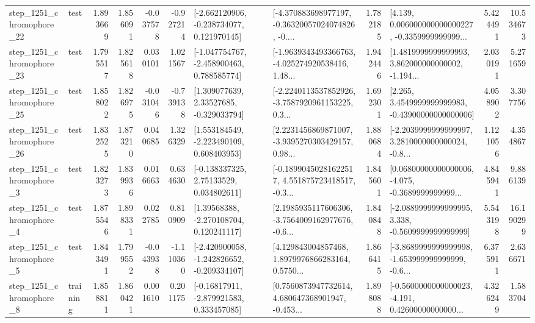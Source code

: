 \begin{tabular}{llrrrrllrlrr}
 step\_1251\_chromophore\_22 &      test &      1.893669 &    1.856091 &     -0.037578 & -0.927214 &   [-2.662120906, -0.238734077, 0.121970145] &  [-4.370883698977197, -0.36320057024074826, -0.... &       1.782185 &  [4.139, 0.006000000000000227, -0.3359999999999... &            5.424491 &         10.534673 \\
 step\_1251\_chromophore\_23 &      test &      1.795517 &    1.825618 &      0.030101 &  1.021567 &   [-1.047754767, -2.458900463, 0.788585774] &  [-1.9639343493366763, -4.025274920538416, 1.48... &       1.942446 &  [1.4819999999999993, 3.862000000000002, -1.194... &            2.030191 &          5.271659 \\
 step\_1251\_chromophore\_25 &      test &      1.858022 &    1.826975 &     -0.031046 & -0.739138 &     [1.309077639, 2.33527685, -0.329033794] &  [-2.2240113537852926, -3.7587920961153225, 0.3... &       1.692301 &  [2.265, 3.4549999999999983, -0.43900000000000006] &            4.058902 &          3.307756 \\
 step\_1251\_chromophore\_26 &      test &      1.832525 &    1.873210 &      0.040685 &  1.326329 &    [1.553184549, -2.223490109, 0.608403953] &  [2.2231456869871007, -3.9395270303429157, 0.98... &       1.880684 &  [-2.2039999999999997, 3.2810000000000024, -0.8... &            1.121056 &          4.354867 \\
  step\_1251\_chromophore\_3 &      test &      1.823273 &    1.839936 &      0.016663 &  0.634630 &     [-0.138337325, 2.75133529, 0.034802611] &  [-0.18990450281622517, 4.551875723418517, -0.3... &       1.845601 &  [0.06800000000000006, -4.075, -0.3689999999999... &            4.845941 &          9.886139 \\
  step\_1251\_chromophore\_4 &      test &      1.875546 &    1.898331 &      0.022785 &  0.810909 &     [1.39568388, -2.270108704, 0.120241117] &  [2.1985935117606306, -3.7564009162977676, -0.6... &       1.840848 &  [-2.0889999999999995, 3.338, -0.5609999999999999] &            5.543198 &         16.190299 \\
  step\_1251\_chromophore\_5 &      test &      1.843491 &    1.799552 &     -0.043938 & -1.110360 &  [-2.420900058, -1.242826652, -0.209334107] &  [4.129843004857468, 1.8979976866283164, 0.5750... &       1.866415 &  [-3.8689999999999998, -1.653999999999999, -0.6... &            6.375911 &          2.636671 \\
  step\_1251\_chromophore\_8 &  training &      1.858811 &    1.860421 &      0.001610 &  0.201175 &    [-0.16817911, -2.879921583, 0.333457085] &  [0.7560873947732614, 4.680647368901947, -0.453... &       1.898088 &  [-0.5600000000000023, -4.191, 0.42600000000000... &            4.326249 &          1.583704 \\

\end{tabular}
